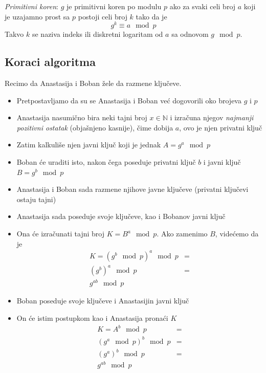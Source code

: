 \documentclass[a4paper]{article}
\begin{document}
\emph{Primitivni koren}: $g$ je primitivni koren po modulu $p$ ako za svaki celi broj $a$ koji je uzajamno prost sa $p$ postoji celi broj $k$ tako da je
    \[g^k \equiv a \mod p\]
Takvo $k$ se naziva indeks ili diskretni logaritam od $a$ sa odnovom $g \mod p$.



\subsection{Koraci algoritma}
\label{subsec:koraci_algoritma}

Recimo da Anastasija i Boban žele da razmene ključeve.
\begin{itemize}
    \item Pretpostavljamo da su se Anastasija i Boban već dogovorili oko brojeva $g$ i $p$
    \item Anastasija nasumično bira neki tajni broj $x \in \mathbb{N}$ i izračuna njegov \emph{najmanji pozitivni ostatak} 
        (objašnjeno kasnije), čime dobija  $a$, ovo je njen privatni ključ
    \item Zatim kalkuliše njen javni ključ koji je jednak $A = g^a \mod p$ 
    \item Boban će uraditi isto, nakon čega poseduje privatni ključ $b$ i javni ključ $B = g^b \mod p$
    \item Anastasija i Boban sada razmene njihove javne ključeve (privatni ključevi ostaju tajni)
    \item Anastasija sada poseduje svoje ključeve, kao i Bobanov javni ključ
    \item Ona će izračunati tajni broj $K = B^a \mod p$. Ako zamenimo $B$, videćemo da je
        \begin{align*}
            K = (g^b \mod p)^a \mod p &=\\ (g^b)^a \mod p &=\\ g^{ab} \mod p
        \end{align*}
    \item Boban poseduje svoje ključeve i Anastasijin javni ključ
    \item On će istim postupkom kao i Anastasija pronaći $K$
        \begin{align*}
            K = A^b \mod p &=\\ (g^a \mod p)^b \mod p &=\\ (g^a)^b \mod p &=\\ g^{ab} \mod p
        \end{align*}
\end{itemize}
\end{document}
